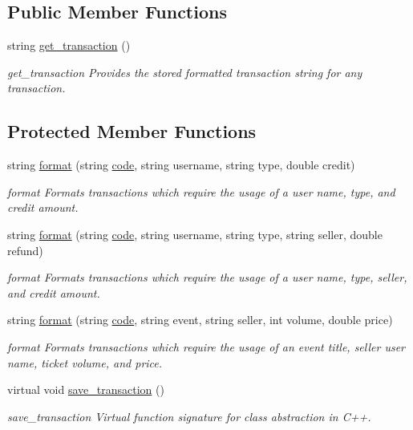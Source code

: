 \subsection*{Public Member Functions}
\begin{DoxyCompactItemize}
\item 
string \hyperlink{class_transaction_a810100a471550d38251b98cc782bc940}{get\-\_\-transaction} ()
\begin{DoxyCompactList}\small\item\em get\-\_\-transaction Provides the stored formatted transaction string for any transaction. \end{DoxyCompactList}\end{DoxyCompactItemize}
\subsection*{Protected Member Functions}
\begin{DoxyCompactItemize}
\item 
string \hyperlink{class_transaction_a4cfd9d4cfae996ebb05e38c4f04dae70}{format} (string \hyperlink{class_transaction_abbc0a016a8f13d797228d020eb94a769}{code}, string username, string type, double credit)
\begin{DoxyCompactList}\small\item\em format Formats transactions which require the usage of a user name, type, and credit amount. \end{DoxyCompactList}\item 
string \hyperlink{class_transaction_ac0dec986e1f72c7ed0aa867d63b87d1b}{format} (string \hyperlink{class_transaction_abbc0a016a8f13d797228d020eb94a769}{code}, string username, string type, string seller, double refund)
\begin{DoxyCompactList}\small\item\em format Formats transactions which require the usage of a user name, type, seller, and credit amount. \end{DoxyCompactList}\item 
string \hyperlink{class_transaction_a74dbd5592b20a901f6c622ab068799cc}{format} (string \hyperlink{class_transaction_abbc0a016a8f13d797228d020eb94a769}{code}, string event, string seller, int volume, double price)
\begin{DoxyCompactList}\small\item\em format Formats transactions which require the usage of an event title, seller user name, ticket volume, and price. \end{DoxyCompactList}\item 
virtual void \hyperlink{class_transaction_a8e5996ad33eb07eef44f55deba6c298e}{save\-\_\-transaction} ()
\begin{DoxyCompactList}\small\item\em save\-\_\-transaction Virtual function signature for class abstraction in C++. \end{DoxyCompactList}\end{DoxyCompactItemize}
